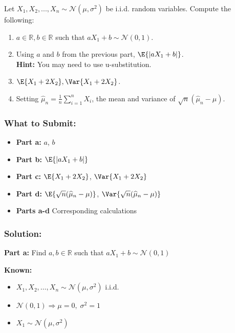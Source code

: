 \documentclass{article}
\begin{document}
\clearpage{}
\begin{aprob}
    Let $X_1, X_2, ..., X_n \sim \mathcal{N}(\mu, \sigma^2)$ be i.i.d. random variables. Compute the following:
    \begin{enumerate}
        \item {} $a\in{\mathbb R},b\in{\mathbb R}$ such that $aX_1+b \sim \mathcal{N}(0,1)$.
        \item {} Using $a$ and $b$ from the previous part, $\E{|aX_1+b|}$.\\ \textbf{Hint:} You may need to use u-substitution.
        \item {} $\E{X_1 + 2X_2}, \Var{X_1 + 2X_2}$.
        \item {} Setting $\widehat{\mu}_n = \frac{1}{n} \sum_{i=1}^n X_i$, the mean and variance of $\sqrt{n}(\widehat{\mu}_n - \mu)$.
    \end{enumerate}

    \subsubsection*{What to Submit:}
    \begin{itemize}
        \item \textbf{Part a:} $a$, $b$
        \item \textbf{Part b:} $\E{|aX_1+b|}$
        \item \textbf{Part c:} $\E{X_1 + 2X_2}$, $\Var{X_1 + 2X_2}$
        \item \textbf{Part d:} $\E{\sqrt{n}(\widehat{\mu}_n - \mu)}$, $\Var{\sqrt{n}(\widehat{\mu}_n - \mu)}$
        \item \textbf{Parts a-d} Corresponding calculations
    \end{itemize}

    \subsubsection*{Solution:}

    \begin{mdframed}
    \textbf{\large Part a:} Find $a, b \in \mathbb{R}$ such that $aX_1 + b \sim \mathcal{N}(0,1)$
    \end{mdframed}

    \textbf{Known:}
    \begin{itemize}
        \item $X_1, X_2, \ldots, X_n \sim \mathcal{N}(\mu, \sigma^2)$ i.i.d.
        \item $\mathcal{N}(0, 1) \Rightarrow \mu = 0,\; \sigma^2 = 1$
        \item $X_1 \sim \mathcal{N}(\mu, \sigma^2)$
    \end{itemize}


\end{aprob}
\end{document}
